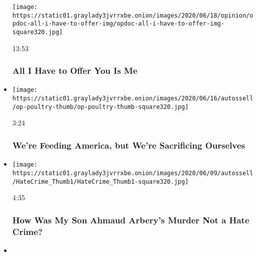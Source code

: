 \begin{itemize}
  \texttt{[image: https://static01.graylady3jvrrxbe.onion/images/2020/06/18/opinion/opdoc-all-i-have-to-offer-img/opdoc-all-i-have-to-offer-img-square320.jpg]}

  13:53

  \hypertarget{all-i-have-to-offer-you-is-me}{%
  \subsubsection{All I Have to Offer You Is
  Me}\label{all-i-have-to-offer-you-is-me}}
\item
  \href{https://www.nytimes3xbfgragh.onion/video/opinion/100000007184138/coronavirus-tyson-poultry.html?action=click\&module=video-series-bar\&region=header\&pgtype=Article\&playlistId=video/opinion}{}

  \texttt{[image: https://static01.graylady3jvrrxbe.onion/images/2020/06/16/autossell/op-poultry-thumb/op-poultry-thumb-square320.jpg]}

  3:24

  \hypertarget{were-feeding-america-but-were-sacrificing-ourselves}{%
  \subsubsection{We're Feeding America, but We're Sacrificing
  Ourselves}\label{were-feeding-america-but-were-sacrificing-ourselves}}
\item
  \href{https://www.nytimes3xbfgragh.onion/video/opinion/100000007179746/hate-crime-bill-ahmaud-arbery.html?action=click\&module=video-series-bar\&region=header\&pgtype=Article\&playlistId=video/opinion}{}

  \texttt{[image: https://static01.graylady3jvrrxbe.onion/images/2020/06/09/autossell/HateCrime\_Thumb1/HateCrime\_Thumb1-square320.jpg]}

  4:35

  \hypertarget{how-was-my-son-ahmaud-arberys-murder-not-a-hate-crime}{%
  \subsubsection{How Was My Son Ahmaud Arbery's Murder Not a Hate
  Crime?}\label{how-was-my-son-ahmaud-arberys-murder-not-a-hate-crime}}
\item
  \href{https://www.nytimes3xbfgragh.onion/video/opinion/100000007179767/coronavirus-hospital-philadelphia.html?action=click\&module=video-series-bar\&region=header\&pgtype=Article\&playlistId=video/opinion}{}


\end{itemize}

